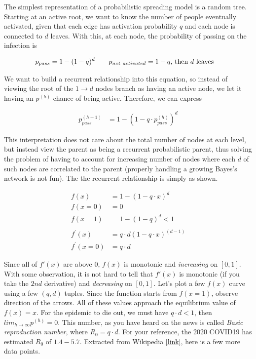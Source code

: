 The simplest representation of a probabilistic spreading model is a random tree. Starting at an active root, we want to know the number of people eventually activated, given that each edge has activation probability $q$ and each node is connected to $d$ leaves. With this, at each node, the probability of passing on the infection is 

\begin{align}
    p_{pass} &= 1 - (1 - q)^d   \text{\qquad $p_{not\ activated}=1-q$, then $d$ leaves}
\end{align}{}

We want to build a recurrent relationship into this equation, so instead of viewing the root of the $1 \rightarrow d$ nodes branch as having an active node, we let it having an $p^{(h)}$ chance of being active. Therefore, we can express

\begin{align}
    p_{pass}^{(h+1)} &= 1 - (1 - q \cdot p_{pass}^{(h)})^d
\end{align}{}

This interpretation does not care about the total number of nodes at each level, but instead view the parent as being a recurrent probabilistic parent, thus solving the problem of having to account for increasing number of nodes where each $d$ of such nodes are correlated to the parent (properly handling a growing Bayes's network is not fun). The the recurrent relationship is simply as shown.

\begin{align}
    f(x) &= 1 - (1 - q \cdot x)^d \\
    f(x=0) &= 0 \\
    f(x=1) &= 1 - (1 - q)^d < 1 \\ \\
    f^'(x) &= q\cdot d(1 - q \cdot x)^{(d - 1)} \\
    f^'(x=0) &= q \cdot d
\end{align}{}

Since all of $f'(x)$ are above $0$, $f(x)$ is monotonic and \textit{increasing} on $[0, 1]$. With some observation, it is not hard to tell that $f'(x)$ is monotonic (if you take the $2nd$ derivative) and \textit{decreasing} on $[0, 1]$. Let's plot a few $f(x)$ curve using a few $(q, d)$ tuples. Since the function starts from $f(x=1)$, observe direction of the arrows. All of these values approach the equilibrium value of $f(x)=x$. For the epidemic to die out, we must have $q \cdot d < 1$, then $lim_{h \rightarrow \infty}p^{(h)}=0$. This number, as you have heard on the news is called \textit{Basic reproduction number}, where $R_0 = q \cdot d$. For your reference, the 2020 COVID19 has estimated $R_0$ of $1.4 - 5.7$. Extracted from Wikipedia \href{https://en.wikipedia.org/wiki/Basic_reproduction_number}{[link]}, here is a few more data points. 

